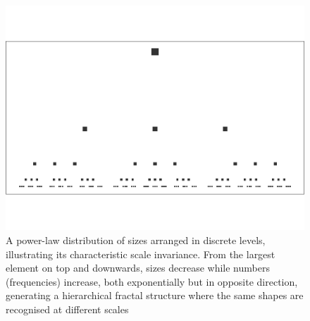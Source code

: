 \documentclass[
  12pt,
]{book}
\begin{document}
\begin{figure}

{\centering \includegraphics[width=0.9\linewidth]{bookdown-demo_files/figure-latex/04-hierarchy-1} 

}

\caption{A power-law distribution of sizes arranged in discrete levels, illustrating its characteristic scale invariance. From the largest element on top and downwards, sizes decrease while numbers (frequencies) increase, both exponentially but in opposite direction, generating a hierarchical fractal structure where the same shapes are recognised at different scales}\label{fig:04-hierarchy}
\end{figure}
\end{document}
